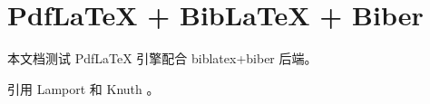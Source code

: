 \documentclass{article}
\begin{document}
\section{PdfLaTeX + BibLaTeX + Biber}

本文档测试 PdfLaTeX 引擎配合 biblatex+biber 后端。

引用 Lamport \cite{lamport1986latex} 和 Knuth \cite{knuth1986texbook}。

\printbibliography
\end{document}
